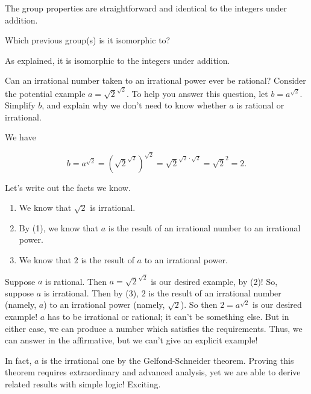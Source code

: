 \documentclass[../key.tex]{subfiles}
\begin{document}
The group properties are straightforward and identical to the integers under addition.

\begin{iinner_problem}
\item Which previous group(s) is it isomorphic to?
\end{iinner_problem}

\noindent As explained, it is isomorphic to the integers under addition.

\begin{outer_problem}
\item Can an irrational number taken to an irrational power ever be rational? Consider the potential example $a = \sqrt{2}^{\sqrt{2}}$. To help you answer this question, let $b = a^{\sqrt{2}}$. Simplify $b$, and explain why we don’t need to know whether $a$ is rational or irrational.
\end{outer_problem}

\noindent We have

$$b = a^{\sqrt{2}} = \left(\sqrt{2}^{\sqrt{2}}\right)^{\sqrt{2}} = \sqrt{2} ^ {\sqrt{2}\cdot \sqrt{2}} = \sqrt{2}^2 = 2.$$

\noindent Let's write out the facts we know.

\begin{enumerate}
    \item We know that $\sqrt{2}$ is irrational. \\
    \item By (1), we know that $a$ is the result of an irrational number to an irrational power. \\
    \item We know that $2$ is the result of $a$ to an irrational power. \\
\end{enumerate}

\noindent Suppose $a$ is rational. Then $a=\sqrt{2}^{\sqrt{2}}$ is our desired example, by (2)! So, suppose $a$ is irrational. Then by (3), $2$ is the result of an irrational number (namely, $a$) to an irrational power (namely, $\sqrt{2}$). So then $2=a^{\sqrt{2}}$ is our desired example! $a$ has to be irrational or rational; it can't be something else. But in either case, we can produce a number which satisfies the requirements. Thus, we can answer in the affirmative, but we can't give an explicit example!

In fact, $a$ is the irrational one by the Gelfond-Schneider theorem. Proving this theorem requires extraordinary and advanced analysis, yet we are able to derive related results with simple logic! Exciting.
\end{document}
